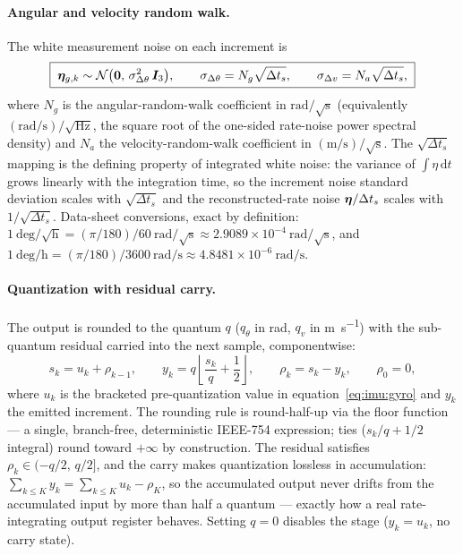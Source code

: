 \paragraph{Angular and velocity random walk.} The white measurement
noise on each increment is
\begin{equation}
  \boxed{\;
  \bm{\eta}_{g,k} \sim \mathcal{N}\bigl(\bm{0},\,
    \sigma_{\Delta\theta}^2\, \bm{I}_3\bigr),
  \qquad
  \sigma_{\Delta\theta} = N_g \sqrt{\Delta t_s},
  \qquad
  \sigma_{\Delta v} = N_a \sqrt{\Delta t_s},
  \;}
  \label{eq:imu:arw}
\end{equation}
where $N_g$ is the angular-random-walk coefficient in
$\unit{\radian}/\sqrt{\unit{\second}}$ (equivalently
$(\unit{\radian\per\second})/\sqrt{\unit{\hertz}}$, the square root of
the one-sided rate-noise power spectral density) and $N_a$ the
velocity-random-walk coefficient in
$(\unit{\metre\per\second})/\sqrt{\unit{\second}}$. The $\sqrt{\Delta
t_s}$ mapping is the defining property of integrated white noise: the
variance of $\int \eta\,\mathrm{d}t$ grows linearly with the integration
time, so the increment noise standard deviation scales with
$\sqrt{\Delta t_s}$ and the reconstructed-rate noise
$\bm{\eta}/\Delta t_s$ scales with $1/\sqrt{\Delta t_s}$. Data-sheet
conversions, exact by definition:
$1\ \mathrm{deg}/\sqrt{\mathrm{h}} = (\pi/180)/60\
\unit{\radian}/\sqrt{\unit{\second}} \approx 2.9089 \times 10^{-4}\
\unit{\radian}/\sqrt{\unit{\second}}$, and
$1\ \mathrm{deg/h} = (\pi/180)/3600\ \unit{\radian\per\second} \approx
4.8481\times 10^{-6}\ \unit{\radian\per\second}$.

\paragraph{Quantization with residual carry.} The output is rounded to
the quantum $q$ ($q_\theta$ in \unit{\radian}, $q_v$ in
\unit{\metre\per\second}) with the sub-quantum residual carried into the
next sample, componentwise:
\begin{equation}
  \boxed{\;
  s_k = u_k + \rho_{k-1},
  \qquad
  y_k = q \left\lfloor \frac{s_k}{q} + \frac{1}{2} \right\rfloor,
  \qquad
  \rho_k = s_k - y_k,
  \qquad
  \rho_0 = 0,
  \;}
  \label{eq:imu:quant}
\end{equation}
where $u_k$ is the bracketed pre-quantization value in
equation~\eqref{eq:imu:gyro} and $y_k$ the emitted increment. The
rounding rule is round-half-up via the floor function --- a single,
branch-free, deterministic IEEE-754 expression; ties ($s_k/q + 1/2$
integral) round toward $+\infty$ by construction. The residual satisfies
$\rho_k \in (-q/2,\, q/2]$, and the carry makes quantization lossless in
accumulation: $\sum_{k \le K} y_k = \sum_{k \le K} u_k - \rho_K$, so the
accumulated output never drifts from the accumulated input by more than
half a quantum --- exactly how a real rate-integrating output register
behaves. Setting $q = 0$ disables the stage ($y_k = u_k$, no carry
state).

